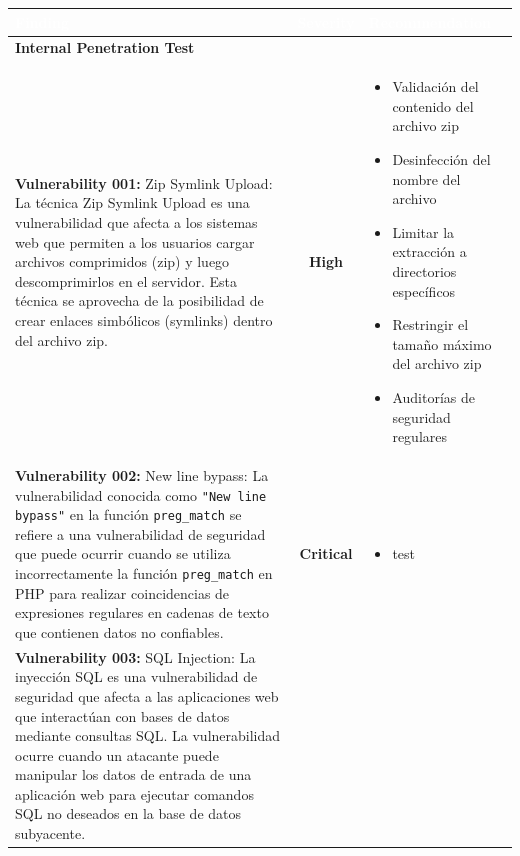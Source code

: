\documentclass[a4paper]{article} %
\begin{document}
    \begin{table}[htbp]
        \centering
        \begin{tabularx}{\textwidth}{|X|c|X|}
            \hline
            \rowcolor{blueColor}
            \textbf{\textcolor{white}{Finding}} &
            \textbf{\textcolor{white}{Severity}} &
            \textbf{\textcolor{white}{Recommendation}} \\
            \hline
            \multicolumn{3}{|l|}{\cellcolor{lightBlueColor}\textbf{Internal Penetration Test}} \\
            \hline
            \textbf{Vulnerability 001:} Zip Symlink Upload: La técnica Zip Symlink Upload es una vulnerabilidad que afecta a los sistemas web que permiten a los usuarios cargar archivos comprimidos (zip) y luego descomprimirlos en el servidor. Esta técnica se aprovecha de la posibilidad de crear enlaces simbólicos (symlinks) dentro del archivo zip. &
            \cellcolor{highColor}\textbf{High} &
                \begin{itemize}
                    \item Validación del contenido del archivo zip
                    \item Desinfección del nombre del archivo
                    \item Limitar la extracción a directorios específicos
                    \item Restringir el tamaño máximo del archivo zip
                    \item Auditorías de seguridad regulares
                \end{itemize} \\
            \hline
            \textbf{Vulnerability 002:} New line bypass: La vulnerabilidad conocida como \verb|"New line bypass"| en la función \verb|preg_match| se refiere a una vulnerabilidad de seguridad que puede ocurrir cuando se utiliza incorrectamente la función \verb|preg_match| en PHP para realizar coincidencias de expresiones regulares en cadenas de texto que contienen datos no confiables. &
            \cellcolor{criticalColor}\textbf{Critical} &
                \begin{itemize}
                    \item test
                \end{itemize} \\
            \hline
            \textbf{Vulnerability 003:} SQL Injection: La inyección SQL es una vulnerabilidad de seguridad que afecta a las aplicaciones web que interactúan con bases de datos mediante consultas SQL. La vulnerabilidad ocurre cuando un atacante puede manipular los datos de entrada de una aplicación web para ejecutar comandos SQL no deseados en la base de datos subyacente. &

\end{tabularx}
\end{table}
\end{document}
